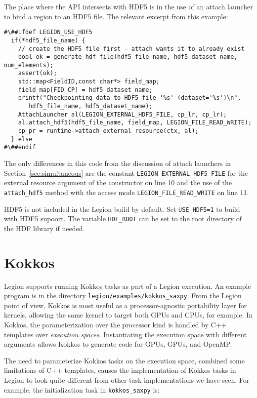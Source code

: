 The place where the API intersects with HDF5 is in the use of an attach launcher to bind a region to an HDF5 file.
The relevant excerpt from this example:
\begin{lstlisting}
#\##ifdef LEGION_USE_HDF5
  if(*hdf5_file_name) {
    // create the HDF5 file first - attach wants it to already exist
    bool ok = generate_hdf_file(hdf5_file_name, hdf5_dataset_name, num_elements);
    assert(ok);
    std::map<FieldID,const char*> field_map;
    field_map[FID_CP] = hdf5_dataset_name;
    printf("Checkpointing data to HDF5 file '%s' (dataset='%s')\n",
	   hdf5_file_name, hdf5_dataset_name);
    AttachLauncher al(LEGION_EXTERNAL_HDF5_FILE, cp_lr, cp_lr);
    al.attach_hdf5(hdf5_file_name, field_map, LEGION_FILE_READ_WRITE);
    cp_pr = runtime->attach_external_resource(ctx, al);
  } else
#\##endif
\end{lstlisting}
The only differences in this code from the discussion of attach
launchers in Section~\ref{sec:simultaneous} are
the constant {\tt LEGION\_EXTERNAL\_HDF5\_FILE} for the external resource argument of the constructor on line 10 and the use of the
{\tt attach\_hdf5} method with the access mode {\tt  LEGION\_FILE\_READ\_WRITE} on line 11.

HDF5 is not included in the Legion build by default.  Set {\tt USE\_HDF5=1} to build with HDF5 supoort.
The variable {\tt HDF\_ROOT} can be set to the root directory of the HDF library if needed.

\section{Kokkos}
\label{sec:kokkos}

Legion supports running Kokkos tasks as part of a Legion execution.  An example program is in the directory
{\tt legion/examples/kokkos\_saxpy}.  From the Legion point of view, Kokkos is most useful as a processor-agnostic
portability layer for kernels, allowing the same kernel to target both GPUs and CPUs, for example.
In Kokkos, the parameterization over the processor kind is handled by C++ templates over {\em execution spaces}.
Instantiating the execution space with different arguments allows Kokkos to generate code for GPUs, GPUs, and OpenMP.

The need to parameterize Kokkos tasks on the execution space, combined some limitations of C++ templates,
causes the implementation of Kokkos tasks in Legion to look quite different from other task implementations
we have seen.  For example, the initialization task in {\tt kokkos\_saxpy} is:


